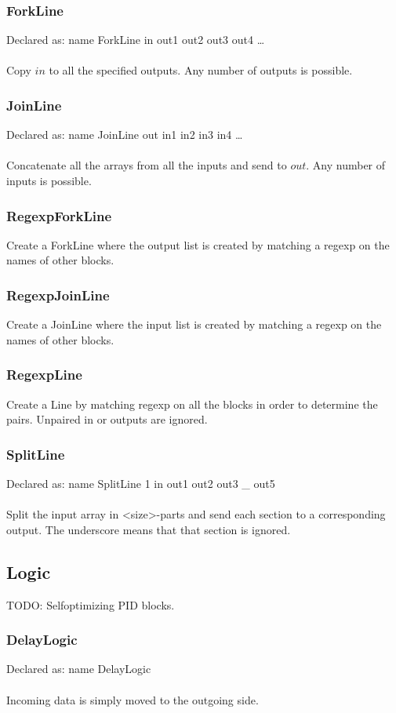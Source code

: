 \documentclass[a4paper]{article}
\begin{document}
\subsubsection{ForkLine}
Declared as: name ForkLine in out1 out2 out3 out4 \ldots\\\\
Copy $in$ to all the specified outputs. Any number of outputs is possible.
\subsubsection{JoinLine}
Declared as: name JoinLine out in1 in2 in3 in4 \ldots\\\\
Concatenate all the arrays from all the inputs and send to $out$. Any number of inputs is possible.
\subsubsection{RegexpForkLine}
Create a ForkLine where the output list is created by matching a regexp on the names of other blocks.
\subsubsection{RegexpJoinLine}
Create a JoinLine where the input list is created by matching a regexp on the names of other blocks.
\subsubsection{RegexpLine}
Create a Line by matching regexp on all the blocks in order to determine the pairs. Unpaired in or outputs are ignored.
\subsubsection{SplitLine}
Declared as: name SplitLine 1 in out1 out2 out3 \_ out5\\\\
Split the input array in <size>-parts and send each section to a corresponding output. The underscore means that that section is ignored.
\subsection{Logic}
TODO: Selfoptimizing PID blocks.
\subsubsection{DelayLogic}
Declared as: name DelayLogic\\\\
Incoming data is simply moved to the outgoing side.
\end{document}

